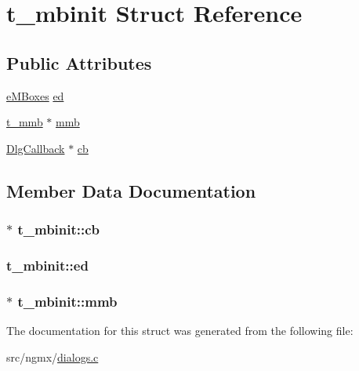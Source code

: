 \hypertarget{structt__mbinit}{\section{t\-\_\-mbinit \-Struct \-Reference}
\label{structt__mbinit}
}
\subsection*{\-Public \-Attributes}
\begin{DoxyCompactItemize}
\item 
\hyperlink{dialogs_8h_a2ec8548fc75b278b10ada864c10089c7}{e\-M\-Boxes} \hyperlink{structt__mbinit_ae1e67ed6d5e720ed0cfef197cdc20dba}{ed}
\item 
\hyperlink{dialogs_8c_a6c60fa5fcad93d89a599e7ee811abdb3}{t\-\_\-mmb} $\ast$ \hyperlink{structt__mbinit_aa31e02f8de911ad1264289391ab9085f}{mmb}
\item 
\hyperlink{xdlg_8h_a5c5a519f0378b9db5d5483f49cb46017}{\-Dlg\-Callback} $\ast$ \hyperlink{structt__mbinit_a3eaf2b66a2e63685e02121979107c660}{cb}
\end{DoxyCompactItemize}


\subsection{\-Member \-Data \-Documentation}
\hypertarget{structt__mbinit_a3eaf2b66a2e63685e02121979107c660}{
\subsubsection[{cb}]{$\ast$ {\bf t\-\_\-mbinit\-::cb}}}\label{structt__mbinit_a3eaf2b66a2e63685e02121979107c660}
\hypertarget{structt__mbinit_ae1e67ed6d5e720ed0cfef197cdc20dba}{
\subsubsection[{ed}]{ {\bf t\-\_\-mbinit\-::ed}}}\label{structt__mbinit_ae1e67ed6d5e720ed0cfef197cdc20dba}
\hypertarget{structt__mbinit_aa31e02f8de911ad1264289391ab9085f}{
\subsubsection[{mmb}]{$\ast$ {\bf t\-\_\-mbinit\-::mmb}}}\label{structt__mbinit_aa31e02f8de911ad1264289391ab9085f}


\-The documentation for this struct was generated from the following file\-:\begin{DoxyCompactItemize}
\item 
src/ngmx/\hyperlink{dialogs_8c}{dialogs.\-c}\end{DoxyCompactItemize}
